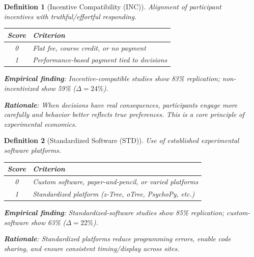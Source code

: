\documentclass[11pt,a4paper]{article}
\newtheorem{definition}{Definition}[section]
\begin{document}
\begin{definition}[Incentive Compatibility (INC)]
\label{def:inc}
Alignment of participant incentives with truthful/effortful responding.

\begin{center}
\begin{tabular}{cl}
\toprule
\textbf{Score} & \textbf{Criterion} \\
\midrule
0 & Flat fee, course credit, or no payment \\
1 & Performance-based payment tied to decisions \\
\bottomrule
\end{tabular}
\end{center}

\textbf{Empirical finding}: Incentive-compatible studies show 83\% replication; non-incentivized show 59\% ($\Delta = 24\%$).

\textbf{Rationale}: When decisions have real consequences, participants engage more carefully and behavior better reflects true preferences. This is a core principle of experimental economics.
\end{definition}

\begin{definition}[Standardized Software (STD)]
\label{def:std}
Use of established experimental software platforms.

\begin{center}
\begin{tabular}{cl}
\toprule
\textbf{Score} & \textbf{Criterion} \\
\midrule
0 & Custom software, paper-and-pencil, or varied platforms \\
1 & Standardized platform (z-Tree, oTree, PsychoPy, etc.) \\
\bottomrule
\end{tabular}
\end{center}

\textbf{Empirical finding}: Standardized-software studies show 85\% replication; custom-software show 63\% ($\Delta = 22\%$).

\textbf{Rationale}: Standardized platforms reduce programming errors, enable code sharing, and ensure consistent timing/display across sites.
\end{definition}

\end{document}

